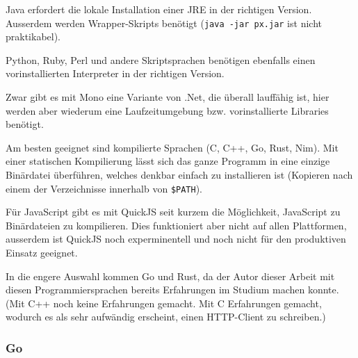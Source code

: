Java erfordert die lokale Installation einer JRE in der richtigen Version. Ausserdem werden Wrapper-Skripts benötigt (\texttt{java -jar px.jar} ist nicht praktikabel).

Python, Ruby, Perl und andere Skriptsprachen benötigen ebenfalls einen vorinstallierten Interpreter in der richtigen Version.

Zwar gibt es mit Mono eine Variante von .Net, die überall lauffähig ist, hier werden aber wiederum eine Laufzeitumgebung bzw. vorinstallierte Libraries benötigt.

Am besten geeignet sind kompilierte Sprachen (C, C++, Go, Rust, Nim). Mit einer statischen Kompilierung lässt sich das ganze Programm in eine einzige Binärdatei überführen, welches denkbar einfach zu installieren ist (Kopieren nach einem der Verzeichnisse innerhalb von \texttt{\$PATH}).

Für JavaScript gibt es mit QuickJS seit kurzem die Möglichkeit, JavaScript zu Binärdateien zu kompilieren. Dies funktioniert aber nicht auf allen Plattformen, ausserdem ist QuickJS noch experminentell und noch nicht für den produktiven Einsatz geeignet.

In die engere Auswahl kommen Go und Rust, da der Autor dieser Arbeit mit diesen Programmiersprachen bereits Erfahrungen im Studium machen konnte. (Mit C++ noch keine Erfahrungen gemacht. Mit C Erfahrungen gemacht, wodurch es als sehr aufwändig erscheint, einen HTTP-Client zu schreiben.)

\subsubsection{Go}


